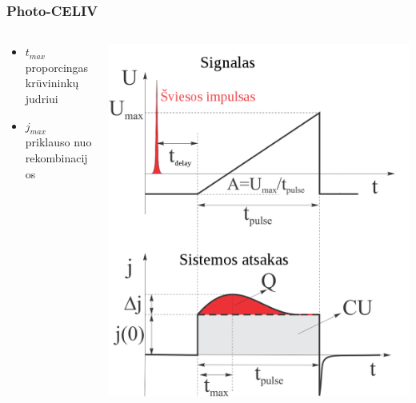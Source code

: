 \documentclass{beamer}
\begin{document}
  \begin{frame}
	\frametitle{Photo-CELIV}
  \begin{columns}
    \begin{column}{.45\textwidth}
     \begin{block}{}
	\begin{itemize}
      \item $t_{max}$ proporcingas krūvininkų judriui
      \item $j_{max}$ priklauso nuo rekombinacijos
    \end{itemize}
    \end{block}
    \end{column}
    \begin{column}{.55\textwidth}
    \begin{block}{}
    \includegraphics[height=0.8\textheight]{./media/celivTransients.png}
    \end{block}
    \end{column}
  \end{columns}
\end{frame}
  
\end{document}
